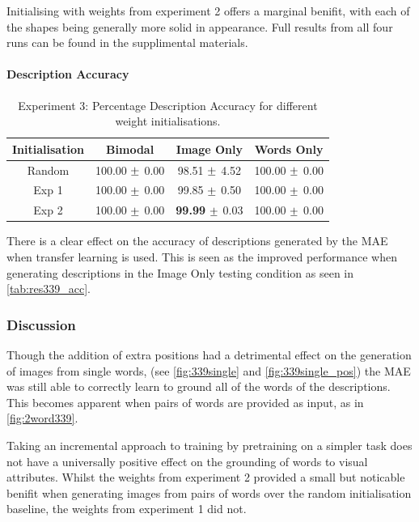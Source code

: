 Initialising with weights from experiment 2 offers a marginal benifit, with each of the shapes being generally more solid in appearance. Full results from all four runs can be found in the supplimental materials.

\paragraph{Description Accuracy}

\begin{table}[h!]
\centering
	\begin{tabular}{|c|c|c|c|}
	\hline
	\textbf{Initialisation} & 	\textbf{Bimodal} & 	\textbf{Image Only} 	& 	\textbf{Words Only} \\ \hline
	Random	&	100.00	$\mypm$	0.00	&	98.51	$\mypm$	4.52	&	100.00	$\mypm$	0.00	\\ \hline
	Exp 1	&	100.00	$\mypm$	0.00	&	99.85	$\mypm$	0.50	&	100.00	$\mypm$	0.00	\\ \hline
	Exp 2	&	100.00	$\mypm$	0.00	&	\textbf{99.99}	$\mypm$ 0.03	&	100.00	$\mypm$	0.00	\\ \hline



	\end{tabular}
\caption{Experiment 3: Percentage Description Accuracy for different weight initialisations. }
\label{tab:res339_acc}
\end{table}

There is a clear effect on the accuracy of descriptions generated by the \ac{MAE} when transfer learning is used. This is seen as the improved performance when generating descriptions in the Image Only testing condition as seen in \autoref{tab:res339_acc}.


\subsubsection{Discussion}
Though the addition of extra positions had a detrimental effect on the generation of images from single words, (see \autoref{fig:339single} and \autoref{fig:339single_pos}) the \ac{MAE} was still able to correctly learn to ground all of the words of the descriptions. This becomes apparent when pairs of words are provided as input, as in \autoref{fig:2word339}.

Taking an incremental approach to training by pretraining on a simpler task does not have a universally positive effect on the grounding of words to visual attributes. Whilst the weights from experiment 2 provided a small but noticable benifit when generating images from pairs of words over the random initialisation baseline, the weights from experiment 1 did not. 

